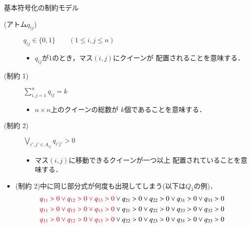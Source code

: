 \begin{frame}{基本符号化の制約モデル}
 \begin{block}{}
  \begin{description}
   \item[{\color{black} (アトム$q_{ij}$})] 
	      $q_{ij} \in \{0,1\} 
	      \qquad (1 \leq i,j \leq n)$ \par
	      \begin{itemize}
	       \item $q_{ij}$が1のとき，マス$(i,j)$にクイーンが
		     配置されることを意味する．
	      \end{itemize}
   \item[{\color{black}(制約 1)}] 
	      $\sum\limits_{i,j=1}^{n} q_{ij} = k$ \par
	      \begin{itemize}
	       \item $n \times n$上のクイーンの総数が
		     $k$個であることを意味する．
	      \end{itemize}
   \item[{\color{black}(制約 2)}] 
	      $\bigvee\limits_{i',j' \in A_{ij}}q_{i'j'} > 0$ \par
	      \begin{itemize}
	       \item マス$(i,j)$に移動できるクイーンが一つ以上
		     配置されていることを意味する．
	      \end{itemize}
	      
  \end{description}
 \end{block}
 \begin{alertblock}{}
  \begin{itemize}
   \item (制約 2)中に同じ部分式が何度も出現してしまう(以下は$Q_3$の例)．
   \begin{align*}
    {\color{red} q_{11}>0 \vee q_{12}>0 \vee q_{13}>0} 
    \vee q_{21}>0 \vee q_{22}>0 \vee q_{31}>0 \vee q_{33}>0 \\
    {\color{red} q_{11}>0 \vee q_{12}>0 \vee q_{13}>0} 
    \vee q_{21}>0 \vee q_{22}>0 \vee q_{23}>0 \vee q_{32}>0 \\
    {\color{red} q_{11}>0 \vee q_{12}>0 \vee q_{13}>0} 
    \vee q_{22}>0 \vee q_{23}>0 \vee q_{31}>0 \vee q_{33}>0 
   \end{align*}
  \end{itemize}
 \end{alertblock}
\end{frame}

